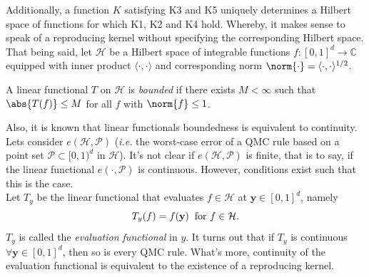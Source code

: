 \vspace{2mm}
Additionally, a function $K$ satisfying K3 and K5 uniquely determines a Hilbert space of functions  for which K1, K2 and K4 hold. Whereby, it makes sense to speak of a reproducing kernel without specifying the corresponding Hilbert space.\\

That being said, let $\mathcal{H}$ be a Hilbert space of integrable functions $f : [0,1]^d \longrightarrow \mathbb{C}$ equipped with inner product $\langle \cdot,\cdot \rangle$ and corresponding norm $\norm{\cdot} = \langle \cdot,\cdot \rangle^{1/2}$.\\

\begin{Def}
    A linear functional $T$ on $\mathcal{H}$ is \textit{bounded} if there exists $M<\infty$ such that $\abs{T(f)}\leq M$ for all $f$ with $\norm{f}\leq 1$.
\end{Def}

\vspace{2mm}
Also, it is known that linear functionals boundedness is equivalent to continuity.\\

Lets consider $e(\mathcal{H},\mathcal{P})$ (\textit{i.e.} the worst-case error of a QMC rule based on a point set $\mathcal{P}\subset [0,1)^d$ in $\mathcal{H}$). It's not clear if $e(\mathcal{H},\mathcal{P})$ is finite, that is to say, if the linear functional $e(\cdot,\mathcal{P})$ is continuous. However, conditions exist such that this is the case.\\

Let $T_y$ be the linear functional that evaluates $f\in \mathcal{H}$ at $\textbf{y}\in [0,1]^d$, namely
\begin{equation*}
    T_y(f) = f(\textbf{y}) \hspace{2mm} \text{for } f\in \mathcal{H}.
\end{equation*}
$T_y$ is called the \textit{evaluation functional} in $y$. It turns out that if $T_y$ is continuous $\forall \textbf{y} \in [0,1]^d$, then so is every QMC rule. What's more, continuity of the evaluation functional is equivalent to the existence of a reproducing kernel.\\


